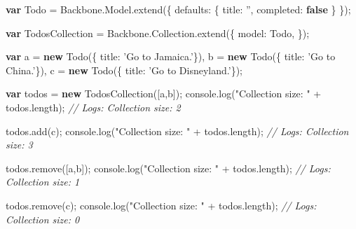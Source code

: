 \documentclass[9pt]{book}
\newenvironment{Shaded}{}{}
\newcommand{\KeywordTok}[1]{\textcolor[rgb]{0.00,0.44,0.13}{\textbf{{#1}}}}
\newcommand{\DataTypeTok}[1]{\textcolor[rgb]{0.56,0.13,0.00}{{#1}}}
\newcommand{\StringTok}[1]{\textcolor[rgb]{0.25,0.44,0.63}{{#1}}}
\newcommand{\CommentTok}[1]{\textcolor[rgb]{0.38,0.63,0.69}{\textit{{#1}}}}
\newcommand{\OtherTok}[1]{\textcolor[rgb]{0.00,0.44,0.13}{{#1}}}
\newcommand{\FunctionTok}[1]{\textcolor[rgb]{0.02,0.16,0.49}{{#1}}}
\newcommand{\NormalTok}[1]{{#1}}
\begin{document}
\begin{Shaded}
\begin{Highlighting}[]
\KeywordTok{var} \NormalTok{Todo = }\OtherTok{Backbone}\NormalTok{.}\OtherTok{Model}\NormalTok{.}\FunctionTok{extend}\NormalTok{(\{}
  \DataTypeTok{defaults}\NormalTok{: \{}
    \DataTypeTok{title}\NormalTok{: }\StringTok{''}\NormalTok{,}
    \DataTypeTok{completed}\NormalTok{: }\KeywordTok{false}
  \NormalTok{\}}
\NormalTok{\});}

\KeywordTok{var} \NormalTok{TodosCollection = }\OtherTok{Backbone}\NormalTok{.}\OtherTok{Collection}\NormalTok{.}\FunctionTok{extend}\NormalTok{(\{}
  \DataTypeTok{model}\NormalTok{: Todo,}
\NormalTok{\});}

\KeywordTok{var} \NormalTok{a = }\KeywordTok{new} \FunctionTok{Todo}\NormalTok{(\{ }\DataTypeTok{title}\NormalTok{: }\StringTok{'Go to Jamaica.'}\NormalTok{\}),}
    \NormalTok{b = }\KeywordTok{new} \FunctionTok{Todo}\NormalTok{(\{ }\DataTypeTok{title}\NormalTok{: }\StringTok{'Go to China.'}\NormalTok{\}),}
    \NormalTok{c = }\KeywordTok{new} \FunctionTok{Todo}\NormalTok{(\{ }\DataTypeTok{title}\NormalTok{: }\StringTok{'Go to Disneyland.'}\NormalTok{\});}

\KeywordTok{var} \NormalTok{todos = }\KeywordTok{new} \FunctionTok{TodosCollection}\NormalTok{([a,b]);}
\OtherTok{console}\NormalTok{.}\FunctionTok{log}\NormalTok{(}\StringTok{"Collection size: "} \NormalTok{+ }\OtherTok{todos}\NormalTok{.}\FunctionTok{length}\NormalTok{);}
\CommentTok{// Logs: Collection size: 2}

\OtherTok{todos}\NormalTok{.}\FunctionTok{add}\NormalTok{(c);}
\OtherTok{console}\NormalTok{.}\FunctionTok{log}\NormalTok{(}\StringTok{"Collection size: "} \NormalTok{+ }\OtherTok{todos}\NormalTok{.}\FunctionTok{length}\NormalTok{);}
\CommentTok{// Logs: Collection size: 3}

\OtherTok{todos}\NormalTok{.}\FunctionTok{remove}\NormalTok{([a,b]);}
\OtherTok{console}\NormalTok{.}\FunctionTok{log}\NormalTok{(}\StringTok{"Collection size: "} \NormalTok{+ }\OtherTok{todos}\NormalTok{.}\FunctionTok{length}\NormalTok{);}
\CommentTok{// Logs: Collection size: 1}

\OtherTok{todos}\NormalTok{.}\FunctionTok{remove}\NormalTok{(c);}
\OtherTok{console}\NormalTok{.}\FunctionTok{log}\NormalTok{(}\StringTok{"Collection size: "} \NormalTok{+ }\OtherTok{todos}\NormalTok{.}\FunctionTok{length}\NormalTok{);}
\CommentTok{// Logs: Collection size: 0}
\end{Highlighting}
\end{Shaded}
\end{document}
